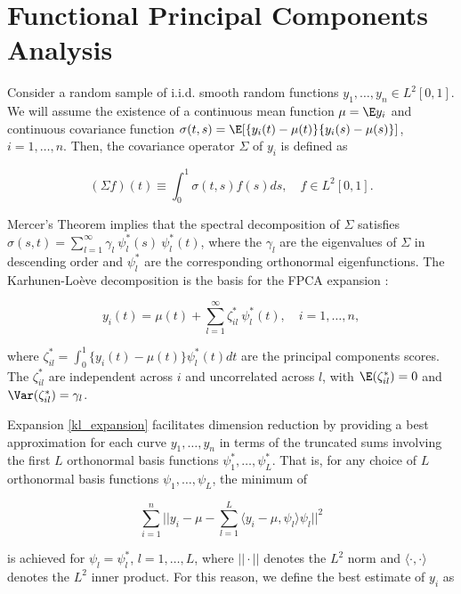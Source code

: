 \documentclass[12pt]{article}
\theoremstyle{plain}
\theoremstyle{definition}
\theoremstyle{remark}
\begin{document}
\section{Functional Principal Components Analysis}
\label{sec:fpca}

Consider a random sample of i.i.d. smooth random functions $y_1, \dots, y_n \in L^2 [0, 1]$. We will assume the
existence of a continuous mean function $\mu = \E y_i$ and continuous covariance function
$\sigma (t, s) = \E [ \{ y_i (t) - \mu (t) \} \{ y_i (s) - \mu (s) \} ]$, $i = 1, \dots, n$.
Then, the covariance operator $\Sigma$ of $y_i$ is defined as

\begin{equation}
	(\Sigma f) (t) \equiv \int_0^1 \sigma (t, s) f(s) ds, \quad f \in L^2 [0, 1].
\label{cov_op}
\end{equation}

\noindent Mercer's Theorem implies that the spectral decomposition of $\Sigma$ satisfies $\sigma (s, t) =
\sum_{l=1}^\infty \gamma_l \ \psi^*_l (s) \ \psi^*_l (t)$, where the $\gamma_l$ are the eigenvalues of
$\Sigma$ in descending
order and $\psi^*_l$ are the corresponding orthonormal eigenfunctions. The Karhunen-Lo\`{e}ve decomposition
is the basis for the FPCA expansion \cite{yao05}:

\begin{equation}
	y_i (t) = \mu (t) + \sum_{l=1}^\infty \zeta^*_{il} \ \psi^*_l (t), \quad i = 1, \dots, n,
\label{kl_expansion}
\end{equation}

\noindent where $\zeta^*_{il} = \int_0^1 \{ y_i (t) - \mu(t) \} \psi^*_l(t) dt$ are the principal components
scores. The $\zeta^*_{il}$ are independent across $i$ and uncorrelated across $l$, with $\E (\zeta^*_{il}) = 0$
and $\Var (\zeta^*_{il}) = \gamma_l$.

Expansion \eqref{kl_expansion} facilitates dimension reduction by providing a best approximation for each
curve $y_1, \dots, y_n$ in terms of the truncated sums involving the first $L$ orthonormal basis functions
$\psi^*_1, \dots, \psi^*_L$. That is, for any choice of $L$ orthonormal basis functions $\psi_1, \dots, \psi_L$, the
minimum of

\[
	\sum_{i=1}^n || y_i - \mu - \sum_{l=1}^L \langle y_i - \mu , \psi_l \rangle \psi_l ||^2
\]

\noindent is achieved for $\psi_l = \psi^*_l$, $l = 1, \dots, L$, where $|| \cdot ||$ denotes the $L^2$ norm and
$\langle \cdot, \cdot \rangle$ denotes the $L^2$ inner product. For this reason, we define the best estimate of
$y_i$ as
\end{document}
